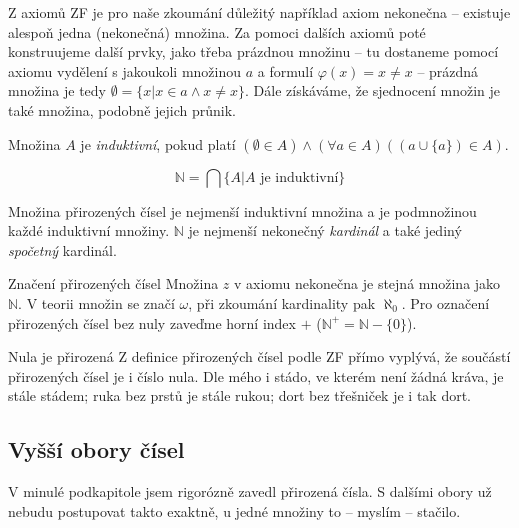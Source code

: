Z axiomů ZF je pro naše zkoumání důležitý například axiom nekonečna -- existuje alespoň jedna (nekonečná) množina. Za pomoci dalších axiomů poté konstruujeme další prvky, jako třeba prázdnou množinu -- tu dostaneme pomocí axiomu vydělení s jakoukoli množinou $a$ a formulí $\varphi(x) = x \neq x$ -- prázdná množina je tedy $\emptyset = \{ x | x \in a \land x \neq x \}$. Dále získáváme, že sjednocení množin je také množina, podobně jejich průnik.

\begin{definition}
Množina $A$ je \textit{induktivní}, pokud platí $(\emptyset \in A) \land (\forall a \in A)((a \cup \{ a \}) \in A)$.
\end{definition}

\begin{definition}
\begin{equation}
\mathbb{N} = \bigcap \{A | A \text{~je induktivní} \}
\end{equation}
\end{definition}

Množina přirozených čísel je nejmenší induktivní množina a je podmnožinou každé induktivní množiny. $\mathbb{N}$ je nejmenší nekonečný \textit{kardinál} a také jediný \textit{spočetný} kardinál.

\begin{myremark}{Značení přirozených čísel}
Množina $z$ v axiomu nekonečna je stejná množina jako $\mathbb{N}$. V teorii množin se značí $\omega$, při zkoumání kardinality pak $\aleph_0$. Pro označení přirozených čísel bez nuly zaveďme horní index $+$ ($\mathbb{N^+} = \mathbb{N} - \{0\}$).
\end{myremark}

\begin{myremark}{Nula je přirozená}
Z definice přirozených čísel podle ZF přímo vyplývá, že součástí přirozených čísel je i číslo nula. Dle mého i stádo, ve kterém není žádná kráva, je stále stádem; ruka bez prstů je stále rukou; dort bez třešniček je i tak dort.\end{myremark}

\subsection{Vyšší obory čísel}
\label{kap:vyssi_obory_cisel}
V minulé podkapitole jsem rigorózně zavedl přirozená čísla. S dalšími obory už nebudu postupovat takto exaktně, u jedné množiny to -- myslím -- stačilo.


